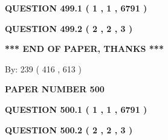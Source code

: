 \documentclass[12pt]{article}
\begin{document}
   
   
   
 \vspace{0.2in}
 
 
 
 
   
   
  
\vspace{0.2in}
  
{\textbf{\Large{QUESTION
499.1 
 ( 1 , 1 , 6791 )
}}}
  
  
  
\vspace{0.2in}
  
{\textbf{\Large{QUESTION
499.2 
 ( 2 , 2 , 3 )
}}}
  
  
   
   
 \vspace{0.2in}
 
   
   
   
   
\vspace{1.0in} 
{\textbf{\large{ *** END OF PAPER, THANKS *** }}} 
   
   
\hspace{1.0in} By: 
 239 ( 416 ,  613 )
   
   
   
   
\newpage 
\setcounter{page}{ 
   500001 } 
   
   
   
   
 {\textbf{ \Large{ PAPER NUMBER  500  }}}
   
   
\vspace{0.2in}
   
   
   
   
   
   
 \vspace{0.2in}
 
 
 
 
   
   
  
\vspace{0.2in}
  
{\textbf{\Large{QUESTION
500.1 
 ( 1 , 1 , 6791 )
}}}
  
  
  
\vspace{0.2in}
  
{\textbf{\Large{QUESTION
500.2 
 ( 2 , 2 , 3 )
}}}
  
  
   
   
 \vspace{0.2in}
 
\end{document}
